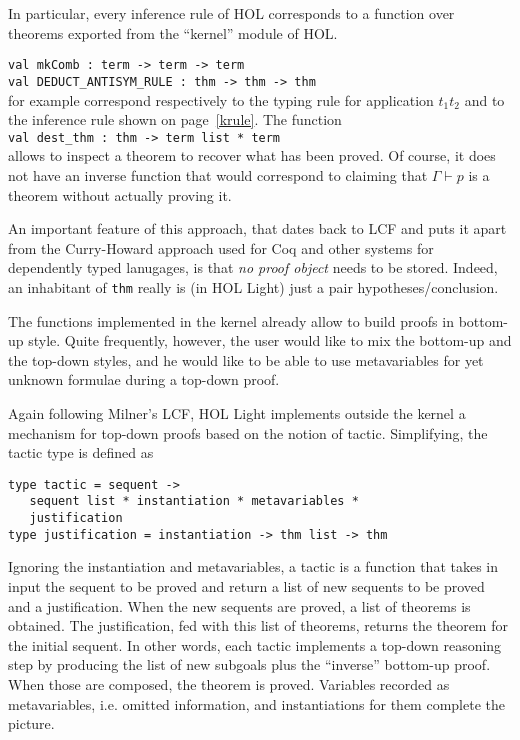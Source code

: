 \documentclass[preprint]{sigplanconf}
\begin{document}
In particular, every inference rule of HOL corresponds to a function over theorems exported from the ``kernel'' module of HOL.

\noindent
\verb+val mkComb : term -> term -> term+\\
\verb+val DEDUCT_ANTISYM_RULE : thm -> thm -> thm+\\
for example correspond respectively to the typing rule for application $t_1 t_2$ and to the inference rule shown on page~\ref{krule}. The function\\
\verb+val dest_thm : thm -> term list * term+\\
allows to inspect a theorem to recover what has been proved. Of course, it does not have an inverse function that would correspond to claiming that $\Gamma \vdash p$ is a theorem without actually proving it.

An important feature of this approach, that dates back to LCF and puts it apart from the Curry-Howard approach used for Coq and other systems for dependently typed lanugages, is that \emph{no proof object} needs to be stored. Indeed, an inhabitant of \verb+thm+ really is (in HOL Light) just a pair hypotheses/conclusion.

The functions implemented in the kernel already allow to build proofs in bottom-up style. Quite frequently, however, the user would like to mix the bottom-up and the top-down styles, and he would like to be able to use metavariables for yet unknown formulae during a top-down proof.

Again following Milner's LCF, HOL Light implements outside the kernel a mechanism for top-down proofs based on the notion of tactic. Simplifying, the tactic type is defined as
{\small
\begin{verbatim}
type tactic = sequent ->
   sequent list * instantiation * metavariables *
   justification
type justification = instantiation -> thm list -> thm
\end{verbatim}
}

Ignoring the instantiation and metavariables, a tactic is a function that takes in input the sequent to be proved and return a list of new sequents to be proved and a justification. When the new sequents are proved, a list of theorems is obtained. The justification, fed with this list of theorems, returns the theorem for the initial sequent. In other words, each tactic implements a top-down reasoning step by producing the list of new subgoals plus the ``inverse'' bottom-up proof. When those are composed, the theorem is proved. Variables recorded as metavariables, i.e. omitted information, and instantiations for them complete the picture.
\end{document}
